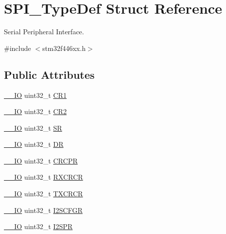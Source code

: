 \hypertarget{struct_s_p_i___type_def}{}\section{S\+P\+I\+\_\+\+Type\+Def Struct Reference}
\label{struct_s_p_i___type_def}


Serial Peripheral Interface.  




{\ttfamily \#include $<$stm32f446xx.\+h$>$}

\subsection*{Public Attributes}
\begin{DoxyCompactItemize}
\item 
\hyperlink{core__sc300_8h_aec43007d9998a0a0e01faede4133d6be}{\+\_\+\+\_\+\+IO} uint32\+\_\+t \hyperlink{struct_s_p_i___type_def_a6ecd5cb63b85c381bd67dc90dd4f573a}{C\+R1}
\item 
\hyperlink{core__sc300_8h_aec43007d9998a0a0e01faede4133d6be}{\+\_\+\+\_\+\+IO} uint32\+\_\+t \hyperlink{struct_s_p_i___type_def_a38cb89a872e456e6ecd29b6c71d85600}{C\+R2}
\item 
\hyperlink{core__sc300_8h_aec43007d9998a0a0e01faede4133d6be}{\+\_\+\+\_\+\+IO} uint32\+\_\+t \hyperlink{struct_s_p_i___type_def_a33f3dd6a505d06fe6c466b63be451891}{SR}
\item 
\hyperlink{core__sc300_8h_aec43007d9998a0a0e01faede4133d6be}{\+\_\+\+\_\+\+IO} uint32\+\_\+t \hyperlink{struct_s_p_i___type_def_a02ef206dd5bb270e1f17fedd71284422}{DR}
\item 
\hyperlink{core__sc300_8h_aec43007d9998a0a0e01faede4133d6be}{\+\_\+\+\_\+\+IO} uint32\+\_\+t \hyperlink{struct_s_p_i___type_def_a609d2a279b1927846a991deb9d0dc0b0}{C\+R\+C\+PR}
\item 
\hyperlink{core__sc300_8h_aec43007d9998a0a0e01faede4133d6be}{\+\_\+\+\_\+\+IO} uint32\+\_\+t \hyperlink{struct_s_p_i___type_def_a60f1f0e77c52e89cfd738999bee5c9d0}{R\+X\+C\+R\+CR}
\item 
\hyperlink{core__sc300_8h_aec43007d9998a0a0e01faede4133d6be}{\+\_\+\+\_\+\+IO} uint32\+\_\+t \hyperlink{struct_s_p_i___type_def_a0b5a7f6383eb478bbcc22a36c5e95ae6}{T\+X\+C\+R\+CR}
\item 
\hyperlink{core__sc300_8h_aec43007d9998a0a0e01faede4133d6be}{\+\_\+\+\_\+\+IO} uint32\+\_\+t \hyperlink{struct_s_p_i___type_def_a4a1547c0ed26f31108910c35d2876b83}{I2\+S\+C\+F\+GR}
\item 
\hyperlink{core__sc300_8h_aec43007d9998a0a0e01faede4133d6be}{\+\_\+\+\_\+\+IO} uint32\+\_\+t \hyperlink{struct_s_p_i___type_def_aff2f386a2566c722f7962377b495f1a2}{I2\+S\+PR}
\end{DoxyCompactItemize}


